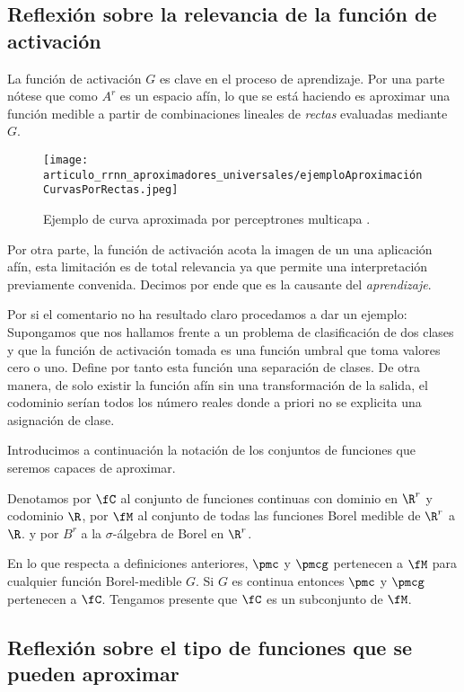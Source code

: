 \subsection{ Reflexión sobre la relevancia de la función de activación}  

La función de activación $G$ es clave en el proceso de aprendizaje.
Por una parte nótese que como $A^r$ es un espacio afín, lo que se está haciendo es 
aproximar una función medible a partir de combinaciones lineales de \textit{rectas} evaluadas mediante $G$. 
 
\begin{figure}[h!]
    \texttt{[image: articulo\_rrnn\_aproximadores\_universales/ejemploAproximaciónCurvasPorRectas.jpeg]}
    \caption{Ejemplo de curva aproximada por perceptrones multicapa \cite{alma991008058419704990}.}
    \label{img:def_esenciales_ejemplo_curva_aproximada_percentrón_multicapa}
\end{figure}

Por otra parte, la función de activación acota la imagen de un una aplicación afín, esta limitación 
es de total relevancia ya que permite una interpretación previamente convenida. 
Decimos por ende que es la causante del \textit{aprendizaje}.     

Por si el comentario no ha resultado claro procedamos a dar un ejemplo:   
Supongamos que nos hallamos frente a un problema de clasificación de dos clases y que la función de activación
tomada es una función umbral que toma valores cero o uno. Define por tanto esta función una separación de clases. 
De otra manera, de solo existir la función afín sin una transformación de la salida, el codominio serían 
todos los número reales donde a priori no se explicita una asignación de clase.  

Introducimos a continuación la notación de los conjuntos de funciones que seremos capaces de aproximar.  

Denotamos por  $\fC$ al conjunto de funciones continuas con dominio en $\R^r$ y codominio $\R$,
por  $\fM$ al conjunto de todas las funciones Borel medible de $\R^r$ a $\R$. 
y por $B^r$ a la $\sigma$-álgebra de Borel en $\R ^r$. 

En lo que respecta a definiciones anteriores, $\pmc$ y $\pmcg$ pertenecen a 
$\fM$ para cualquier función Borel-medible $G$. Si $G$ es continua entonces 
$\pmc$ y $\pmcg$ pertenecen a $\fC$. Tengamos presente que $\fC$ es un subconjunto
de $\fM$.  
  

\subsection{ Reflexión sobre el tipo de funciones que se pueden aproximar}

